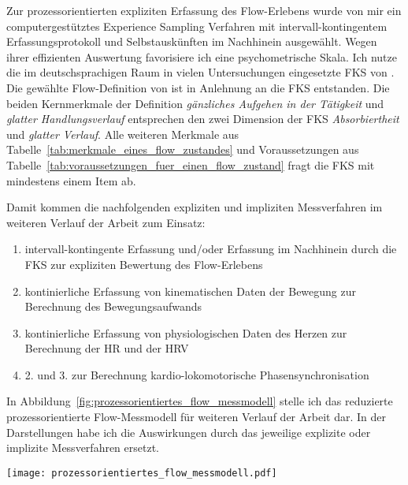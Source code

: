 Zur prozessorientierten expliziten Erfassung des Flow-Erlebens wurde von mir ein computergestütztes Experience Sampling Verfahren mit intervall-kontingentem Erfassungsprotokoll und Selbstauskünften im Nachhinein ausgewählt. Wegen ihrer effizienten Auswertung favorisiere ich eine psychometrische Skala. Ich nutze die im deutschsprachigen Raum in vielen Untersuchungen eingesetzte \ac{FKS} von \citet{Rheinberg2003}. Die gewählte Flow-Definition von \citet{Henk2014} ist in Anlehnung an die \ac{FKS} entstanden. Die beiden Kernmerkmale der Definition \emph{gänzliches Aufgehen in der Tätigkeit} und \emph{glatter Handlungsverlauf} entsprechen den zwei Dimension der \ac{FKS} \emph{Absorbiertheit} und \emph{glatter Verlauf}. Alle weiteren Merkmale aus Tabelle~\ref{tab:merkmale_eines_flow_zustandes} und Voraussetzungen aus Tabelle~\ref{tab:voraussetzungen_fuer_einen_flow_zustand} fragt die \ac{FKS} mit mindestens einem Item ab. 

Damit kommen die nachfolgenden expliziten und impliziten Messverfahren im weiteren Verlauf der Arbeit zum Einsatz:

\begin{enumerate}

	\item intervall-kontingente Erfassung und/oder Erfassung im Nachhinein durch die \ac{FKS} zur expliziten Bewertung des Flow-Erlebens

	\item kontinierliche Erfassung von kinematischen Daten der Bewegung zur Berechnung des Bewegungsaufwands

	\item kontinierliche Erfassung von physiologischen Daten des Herzen zur Berechnung der HR und der \ac{HRV}

	\item 2. und 3. zur Berechnung kardio-lokomotorische Phasensynchronisation

\end{enumerate}

In Abbildung~\ref{fig:prozessorientiertes_flow_messmodell} stelle ich das reduzierte prozessorientierte Flow-Messmodell für weiteren Verlauf der Arbeit dar. In der Darstellungen habe ich die Auswirkungen durch das jeweilige explizite oder implizite Messverfahren ersetzt. 

\begin{sidewaysfigure}
	\texttt{[image: prozessorientiertes\_flow\_messmodell.pdf]}
	\caption[Das prozessorientierte Flow-Messmodell für die Entwicklung eines impliziten Messverfahrens des Flow-Erlebens.]{Das prozessorientierte Flow-Messmodell für die Entwicklung eines impliziten Messverfahrens des Flow-Erlebens. Auswirkungen wurden durch das jeweilige explizite oder implizite Messverfahren ersetzt. Die explizite Befragung durch die \ac{FKS}, findet nicht mehr im Prozess statt.}
	\label{fig:prozessorientiertes_flow_messmodell}
\end{sidewaysfigure}

